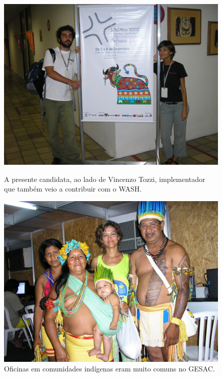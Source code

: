 \documentclass[
12pt,		%
openright,	%
twoside,  %
a4paper,			%
chapter=TITLE,		%
english,			%
french,				%
spanish,			%
brazil				%
]{USPSC-classe/USPSC}
\begin{document}
\begin{figure}[max size={\textwidth}{\textheight}]
\begin{minipage}[b]{0.4\linewidth}
        \centering
                \includegraphics[width=1.0\linewidth]{../../imagens/lacelavince.JPG}
                \caption{A presente candidata, ao lado de Vincenzo Tozzi, implementador que tamb\'em veio a contribuir com o WASH.}
                \label{4459669909728990ef00df4bdb6a369f3449704e}
\end{minipage}
\hspace{0.5cm}
\begin{minipage}[b]{0.4\linewidth}
        \centering
                \includegraphics[width=1.0\linewidth]{../../imagens/povo.JPG}
                \caption{Oficinas em comunidades ind\'{i}genas eram muito comuns no GESAC.}
                \label{50c13a4f82feece9e41db915d8e5bc4c5d5094dd}
\end{minipage}%
\hspace{0.5cm}
\end{figure}
\end{document}
